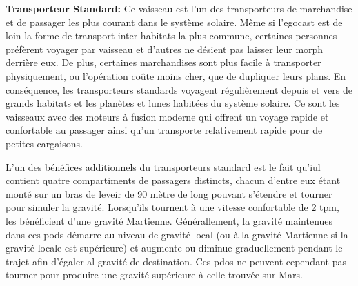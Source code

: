 \textbf{Transporteur Standard:} Ce vaisseau est l'un des transporteurs de marchandise et de passager les plus courant dans le système solaire. Même si l'egocast est de loin la forme de transport inter-habitats la plus commune, certaines personnes préfèrent voyager par vaisseau et d'autres ne désient pas laisser leur morph derrière eux. De plus, certaines marchandises sont plus facile à transporter physiquement, ou l'opération coûte moins cher, que de dupliquer leurs plans. En conséquence, les transporteurs standards voyagent régulièrement depuis et vers de grands habitats et les planètes et lunes habitées du système solaire. Ce sont les vaisseaux avec des moteurs à fusion moderne qui offrent un voyage rapide et confortable au passager ainsi qu'un transporte relativement rapide pour de petites cargaisons. 

L'un des bénéfices additionnels du transporteurs standard est le fait qu'iul contient quatre compartiments de passagers distincts, chacun d'entre eux étant monté sur un bras de leveir de 90 mètre de long pouvant s'étendre et tourner pour simuler la gravité. Lorsqu'ils tournent à une vitesse confortable de 2 tpm, les bénéficient d'une gravité Martienne. Générallement, la gravité maintenues dans ces pods démarre au niveau de gravité local (ou à la gravité Martienne si la gravité locale est supérieure) et augmente ou diminue graduellement pendant le trajet afin d'égaler al gravité de destination. Ces pdos ne peuvent cependant pas tourner pour produire une gravité supérieure à celle trouvée sur Mars. 

